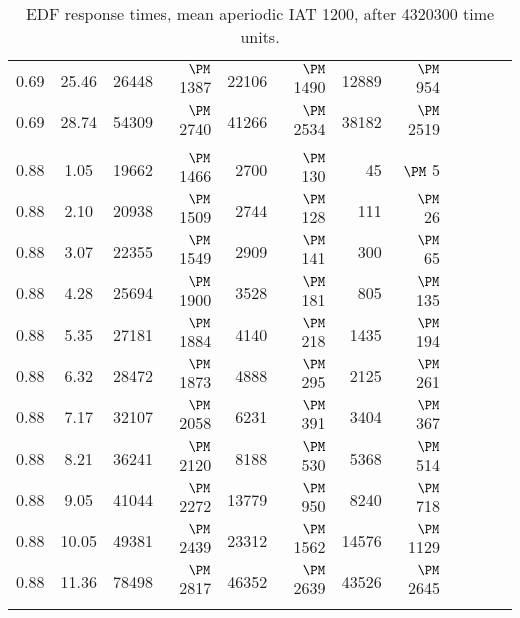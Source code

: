 \begin{table}
\begin{center}
\begin{tabular}{ccr@{}rr@{}rr@{}rr@{}rr@{}r}
0.69 & 25.46 & 26448 & $\PM$ 1387 & 22106 & $\PM$ 1490 & 12889 & $\PM$ 954\\
0.69 & 28.74 & 54309 & $\PM$ 2740 & 41266 & $\PM$ 2534 & 38182 & $\PM$ 2519\\
\\
0.88 & 1.05 & 19662 & $\PM$ 1466 &  2700 & $\PM$ 130 &    45 & $\PM$   5\\
0.88 & 2.10 & 20938 & $\PM$ 1509 &  2744 & $\PM$ 128 &   111 & $\PM$  26\\
0.88 & 3.07 & 22355 & $\PM$ 1549 &  2909 & $\PM$ 141 &   300 & $\PM$  65\\
0.88 & 4.28 & 25694 & $\PM$ 1900 &  3528 & $\PM$ 181 &   805 & $\PM$ 135\\
0.88 & 5.35 & 27181 & $\PM$ 1884 &  4140 & $\PM$ 218 &  1435 & $\PM$ 194\\
0.88 & 6.32 & 28472 & $\PM$ 1873 &  4888 & $\PM$ 295 &  2125 & $\PM$ 261\\
0.88 & 7.17 & 32107 & $\PM$ 2058 &  6231 & $\PM$ 391 &  3404 & $\PM$ 367\\
0.88 & 8.21 & 36241 & $\PM$ 2120 &  8188 & $\PM$ 530 &  5368 & $\PM$ 514\\
0.88 & 9.05 & 41044 & $\PM$ 2272 & 13779 & $\PM$ 950 &  8240 & $\PM$ 718\\
0.88 & 10.05 & 49381 & $\PM$ 2439 & 23312 & $\PM$ 1562 & 14576 & $\PM$ 1129\\
0.88 & 11.36 & 78498 & $\PM$ 2817 & 46352 & $\PM$ 2639 & 43526 & $\PM$ 2645\\
\\
\end{tabular}\end{center}\caption{EDF response times, mean aperiodic IAT 1200, after 4320300 time units.}
\label{tab:B}\end{table}
